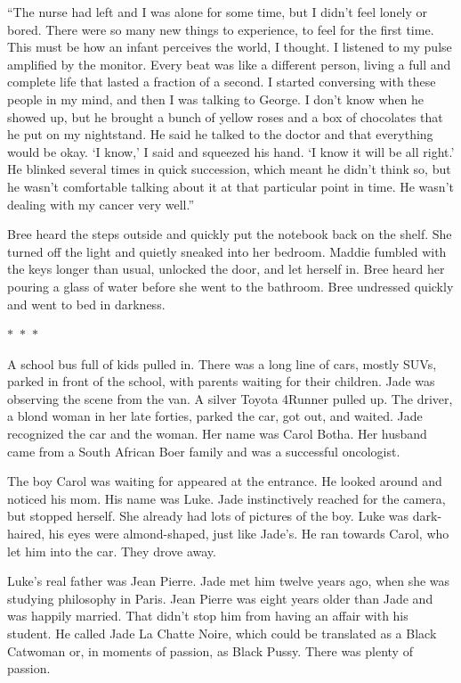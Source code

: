 \documentclass{memoir}
\newcommand{\starbreak}{%
\begin{center}
  $\ast$~$\ast$~$\ast$
\end{center}
}
\begin{document}
``The nurse had left and I was alone for some time, but I didn't feel lonely or bored. There were so many new things to experience, to feel for the first time. This must be how an infant perceives the world, I thought. I listened to my pulse amplified by the monitor. Every beat was like a different person, living a full and complete life that lasted a fraction of a second. I started conversing with these people in my mind, and then I was talking to George. I don't know when he showed up, but he brought a bunch of yellow roses and a box of chocolates that he put on my nightstand. He said he talked to the doctor and that everything would be okay. `I know,' I said and squeezed his hand. `I know it will be all right.' He blinked several times in quick succession, which meant he didn't think so, but he wasn't comfortable talking about it at that particular point in time. He wasn't dealing  with my cancer very well.''

Bree heard the steps outside and quickly put the notebook back on the shelf. She turned off the light and quietly sneaked into her bedroom. Maddie fumbled with the keys longer than usual, unlocked the door, and let herself in. Bree heard her pouring a glass of water before she went to the bathroom. Bree undressed quickly and went to bed in darkness. 

\starbreak

A school bus full of kids pulled in. There was a long line of cars, mostly SUVs, parked in front of the school, with parents waiting for their children. Jade was observing the scene from the van. A silver Toyota 4Runner pulled up. The driver, a blond woman in her late forties, parked the car, got out, and waited. Jade recognized the car and the woman. Her name was Carol Botha. Her husband came from a South African Boer family and was a successful oncologist. 

The boy Carol was waiting for appeared at the entrance. He looked around and noticed his mom. His name was Luke. Jade instinctively reached for the camera, but stopped herself. She already had lots of pictures of the boy. Luke was dark-haired, his eyes were almond-shaped, just like Jade's. He ran towards Carol, who let him into the car. They drove away.

Luke's real father was Jean Pierre. Jade met him twelve years ago, when she was studying philosophy in Paris. Jean Pierre was eight years older than Jade and was happily married. That didn't stop him from having an affair with his student. He called Jade La Chatte Noire, which could be translated as a Black Catwoman or, in moments of passion, as Black Pussy. There was plenty of passion. 
\end{document}
